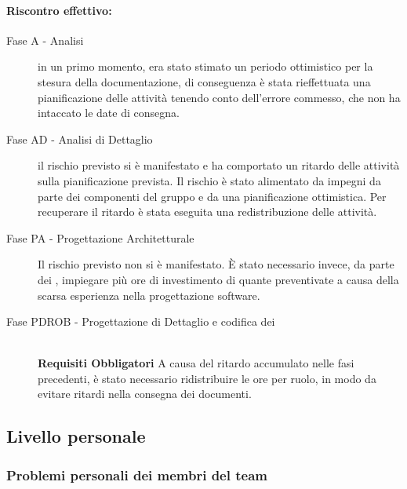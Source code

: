 \documentclass[../PianoProgetto.tex]{subfiles}
\begin{document}
	\paragraph*{Riscontro effettivo:} 
		\begin{description}
			\item[Fase A - Analisi] in un primo momento, era stato stimato un periodo ottimistico per la stesura della documentazione, di conseguenza è stata rieffettuata una pianificazione delle attività tenendo conto dell'errore commesso, che non ha intaccato le date di consegna.
			\item[Fase AD - Analisi di Dettaglio] il rischio previsto si è manifestato e ha comportato un ritardo delle attività sulla pianificazione prevista. Il rischio è stato alimentato da impegni da parte dei componenti del gruppo e da una pianificazione ottimistica. Per recuperare il ritardo è stata eseguita una redistribuzione delle attività.
			\item[Fase PA - Progettazione Architetturale] Il rischio previsto non si è manifestato. È stato necessario invece, da parte dei \progettisti, impiegare più ore di investimento di quante preventivate a causa della scarsa esperienza nella progettazione software\g.
			\item[Fase PDROB - Progettazione di Dettaglio e codifica dei]  \ \\
					\textbf{Requisiti Obbligatori} A causa del ritardo accumulato nelle fasi precedenti, è stato necessario ridistribuire le ore per ruolo, in modo da evitare ritardi nella consegna dei documenti.
		\end{description}
		

\newpage
\subsection{Livello personale}

\subsubsection{Problemi personali dei membri del team}
\label{sec:Problemi personali dei membri del team}
\end{document}
